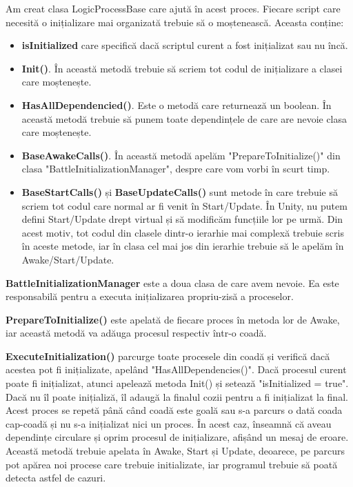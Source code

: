 \documentclass[12pt, a4paper]{article}
\begin{document}
	Am creat clasa LogicProcessBase care ajută în acest proces. Fiecare script care necesită o inițializare mai organizată trebuie să o moștenească. Aceasta conține:
	\begin{itemize}
		\item \textbf{isInitialized} care specifică dacă scriptul curent a fost inițializat sau nu încă.
		\item \textbf{Init()}. În această metodă trebuie să scriem tot codul de inițializare a clasei care moștenește.
		\item \textbf{HasAllDependencied()}. Este o metodă care returnează un boolean. În această metodă trebuie să punem toate dependințele de care are nevoie clasa care moștenește.
		\item \textbf{BaseAwakeCalls()}. În această metodă apelăm "PrepareToInitialize()" din clasa "BattleInitializationManager", despre care vom vorbi în scurt timp.
		\item \textbf{BaseStartCalls()} și \textbf{BaseUpdateCalls()} sunt metode în care trebuie să scriem tot codul care normal ar fi venit în Start/Update. În Unity, nu putem defini Start/Update drept virtual și să modificăm funcțiile lor pe urmă. Din acest motiv, tot codul din clasele dintr-o ierarhie mai complexă trebuie scris în aceste metode, iar în clasa cel mai jos din ierarhie trebuie să le apelăm în Awake/Start/Update.
	\end{itemize}
	
	\textbf{BattleInitializationManager} este a doua clasa de care avem nevoie. Ea este responsabilă pentru a executa inițializarea propriu-zisă a proceselor. 
	\newline
	
	\textbf{PrepareToInitialize()} este apelată de fiecare proces în metoda lor de Awake, iar această metodă va adăuga procesul respectiv într-o coadă.
	\newline
	
	\textbf{ExecuteInitialization()} parcurge toate procesele din coadă și verifică dacă acestea pot fi inițializate, apelând "HasAllDependencies()". Dacă procesul curent poate fi inițializat, atunci apelează metoda Init() și setează "isInitialized = true". Dacă nu îl poate inițializă, îl adaugă la finalul cozii pentru a fi inițializat la final. Acest proces se repetă până când coadă este goală sau s-a parcurs o dată coada cap-coadă și nu s-a inițializat nici un proces. În acest caz, înseamnă că aveau dependințe circulare și oprim procesul de inițializare, afișând un mesaj de eroare. Această metodă trebuie apelata în Awake, Start și Update, deoarece, pe parcurs pot apărea noi procese care trebuie initializate, iar programul trebuie să poată detecta astfel de cazuri.
	
\end{document}
